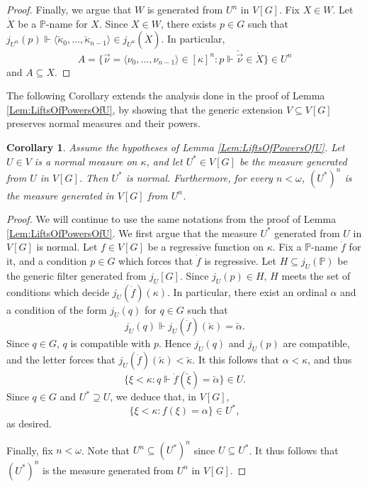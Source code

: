 \documentclass{article}
\theoremstyle{definition}
\theoremstyle{plain}
\newtheorem{corollary}[definition]{Corollary}
\newcommand{\po}{\mathbb{P}}
\newcommand{\la}{\langle}
\newcommand{\ra}{\rangle}
\begin{document}
\begin{proof}
    Finally, we argue that $W$ is generated from $U^n$ in $V[G]$. Fix $X\in W$. Let $\dot{X}$ be a $\po$-name for $X$. Since $X\in W$, there exists $p\in G$ such that $j_{U^n}(p)\Vdash  \la \check{\kappa}_0,\ldots, \check{\kappa}_{n-1} \ra \in j_{U^n}(\dot{X})$. In particular,
    $$ A = \{ \vec{\nu} = \la \nu_0,\ldots, \nu_{n-1} \ra\in [\kappa]^n \colon p\Vdash \check{\vec{\nu}}\in \dot{X} \}\in U^n $$
    and $A\subseteq X$.
    \end{proof}

    The following Corollary extends the analysis done in the proof of Lemma \ref{Lem:LiftsOfPowersOfU}, by showing that the generic extension $V\subseteq V[G]$ preserves normal measures and their powers.
    
    \begin{corollary}\label{Cor:PreservingMeasureNormnalityAndPowers}
        Assume the hypotheses of Lemma \ref{Lem:LiftsOfPowersOfU}. Let $U\in V$ is a normal measure on $\kappa$, and let $U^*\in V[G]$ be the measure generated from $U$ in $V[G]$. Then $U^*$ is normal. Furthermore, for every $n<\omega$, $(U^*)^n$ is the measure generated in $V[G]$ from $U^n$. 
    \end{corollary}
    \begin{proof}
        We will continue to use the same notations from the proof of Lemma \ref{Lem:LiftsOfPowersOfU}. We first argue that the measure $U^*$ generated from $U$ in $V[G]$ is normal. Let $f\in V[G]$ be a regressive function on $\kappa$. Fix a $\po$-name $\dot{f}$ for it, and a condition $p\in G$ which forces that $\dot{f}$ is regressive. Let $H\subseteq j_{U}(\po)$ be the generic filter generated from $j_{U}[G]$. Since $j_U(p)\in H$, $H$ meets the set of conditions which decide $j_U(\dot{f})(\kappa)$. In particular, there exist an ordinal $\alpha$ and a condition of the form $j_U(q)$ for $q\in G$ such that
        $$ j_U(q)\Vdash j_U(\dot{f})(\check{\kappa}) = \check{\alpha}. $$
        Since $q\in G$, $q$ is compatible with $p$. Hence $j_U(q)$ and $j_U(p)$ are compatible, and the letter forces that $j_U(\dot{f})(\check{\kappa})<\check{\kappa}$. It this follows that $\alpha<\kappa$, and thus 
        $$ \{ \xi<\kappa \colon q\Vdash \dot{f}(\check{\xi}) = \check{\alpha} \}\in U. $$
        Since $q\in G$ and $U^*\supseteq U$, we deduce that, in $V[G]$,  
        $$ \{\xi<\kappa \colon f(\xi) = \alpha \}\in U^*, $$
        as desired. 
        
        Finally, fix $n<\omega$. Note that $U^n\subseteq (U^*)^n$ since $U\subseteq U^*$. It thus follows that $(U^*)^n$ is the measure generated from $U^n$ in $V[G]$. 
    \end{proof}
\end{document}
